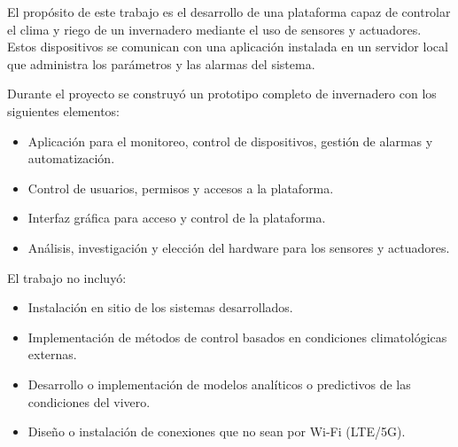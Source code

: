El propósito de este trabajo es el desarrollo de una plataforma capaz de controlar el clima y riego de un invernadero mediante el uso de sensores y actuadores. Estos dispositivos se comunican con una aplicación instalada en un servidor local que administra los parámetros y las alarmas del sistema.

\pagebreak
Durante el proyecto se construyó un prototipo completo de invernadero con los siguientes elementos:
 
\begin{itemize}
	\item Aplicación para el monitoreo, control de dispositivos, gestión de alarmas y automatización.
	\item Control de usuarios, permisos y accesos a la plataforma.
	\item Interfaz gráfica para acceso y control de la plataforma.
	\item Análisis, investigación y elección del hardware para los sensores y actuadores.


\end{itemize}


El trabajo no incluyó:
\begin{itemize}
	\item Instalación en sitio de los sistemas desarrollados.
	\item Implementación de métodos de control basados en condiciones climatológicas externas.
	\item Desarrollo o implementación de modelos analíticos o predictivos de las condiciones del vivero.
	\item Diseño o instalación de conexiones que no sean por Wi-Fi (LTE/5G). 
	
\end{itemize}
